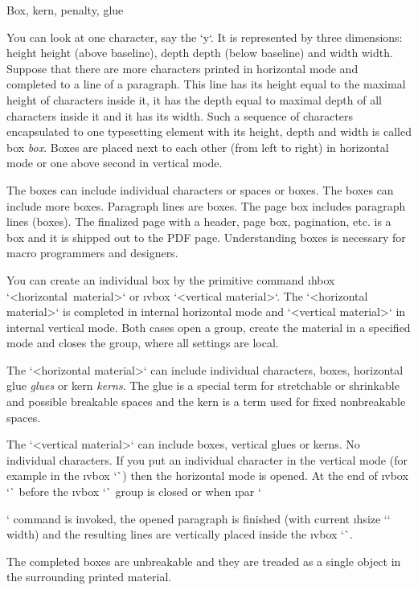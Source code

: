 \sec[boxes] Box, kern, penalty, glue

You can look at one character, say the `y`. It is represented by three
dimensions: \ii height height (above baseline), \ii depth depth (below baseline) 
and \ii width width.
Suppose that there are more characters printed in horizontal mode and
completed to a line of a paragraph. This line has its height equal to
the maximal height of characters inside it, it has the depth equal to maximal
depth of all characters inside it and it has its width. Such a sequence of
characters encapsulated to one typesetting element
with its height, depth and width is
called \ii box {\em box}. Boxes are placed next to each other (from left to
right)
in horizontal mode or one above second in vertical mode. 

The boxes can include individual characters or spaces or boxes. The boxes can
include more boxes. Paragraph lines are boxes. The page box includes paragraph
lines (boxes). The finalized page with a header, page box, pagination,
etc. is a box and it is shipped out to the PDF page. Understanding boxes is
necessary for macro programmers and designers.

You can create an individual box by the primitive command
\i hbox `\hbox{<horizontal material>}`
or \i vbox `\vbox{<vertical material>}`. The `<horizontal material>` is completed in
internal horizontal mode and `<vertical material>` in internal vertical
mode. Both cases open a group, create the material in a specified
mode and closes the group, where all settings are local.

The `<horizontal material>` can include individual characters, boxes,
horizontal \ii glue {\em glues} or \ii kern {\em kerns}. The glue is a special term for
stretchable or shrinkable and possible breakable spaces and the kern is a 
term used for fixed nonbreakable spaces.

The `<vertical material>` can include boxes, vertical glues or kerns. No
individual characters. If you put an individual character in the 
vertical mode (for example in the \i vbox `\vbox`)
then the horizontal mode is opened. At the end of \i vbox `\vbox`\fnote 
{before the \i vbox `\vbox` group is closed}
or when \i par `\par` command is invoked, the opened paragraph is finished (with
current \i hsize `\hsize` width) and the resulting lines are vertically placed
inside the \i vbox `\vbox`. 

The completed boxes are unbreakable and they are treaded as a single object in
the surrounding printed material. 

